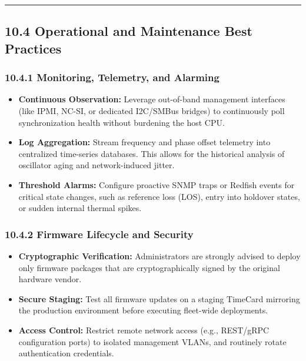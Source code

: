 \begin{center}\rule{0.5\linewidth}{0.5pt}\end{center}

\subsection{10.4 Operational and Maintenance Best
Practices}\label{operational-and-maintenance-best-practices}

\subsubsection{10.4.1 Monitoring, Telemetry, and
Alarming}\label{monitoring-telemetry-and-alarming}

\begin{itemize}
\tightlist
\item
  \textbf{Continuous Observation:} Leverage out-of-band management
  interfaces (like IPMI, NC-SI, or dedicated I2C/SMBus bridges) to
  continuously poll synchronization health without burdening the host
  CPU.
\item
  \textbf{Log Aggregation:} Stream frequency and phase offset telemetry
  into centralized time-series databases. This allows for the historical
  analysis of oscillator aging and network-induced jitter.
\item
  \textbf{Threshold Alarms:} Configure proactive SNMP traps or Redfish
  events for critical state changes, such as reference loss (LOS), entry
  into holdover states, or sudden internal thermal spikes.
\end{itemize}

\subsubsection{10.4.2 Firmware Lifecycle and
Security}\label{firmware-lifecycle-and-security}

\begin{itemize}
\tightlist
\item
  \textbf{Cryptographic Verification:} Administrators are strongly
  advised to deploy only firmware packages that are cryptographically
  signed by the original hardware vendor.
\item
  \textbf{Secure Staging:} Test all firmware updates on a staging
  TimeCard mirroring the production environment before executing
  fleet-wide deployments.
\item
  \textbf{Access Control:} Restrict remote network access (e.g.,
  REST/gRPC configuration ports) to isolated management VLANs, and
  routinely rotate authentication credentials.
\end{itemize}

